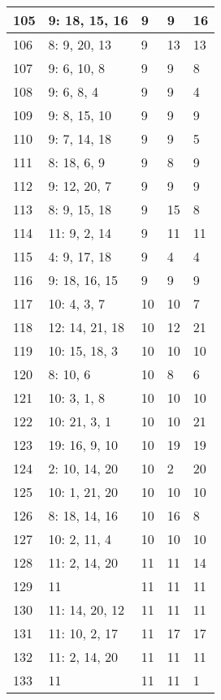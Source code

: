 \documentclass{article} %
\begin{document}
\begin{longtable}{| l | l | l | l | l |}
        105 & 9: 18, 15, 16 & 9 & 9 & 16 \\ \hline
        106 & 8: 9, 20, 13 & 9 & 13 & 13 \\ \hline
        107 & 9: 6, 10, 8 & 9 & 9 & 8 \\ \hline
        108 & 9: 6, 8, 4 & 9 & 9 & 4 \\ \hline
        109 & 9: 8, 15, 10 & 9 & 9 & 9 \\ \hline
        110 & 9: 7, 14, 18 & 9 & 9 & 5 \\ \hline
        111 & 8: 18, 6, 9 & 9 & 8 & 9 \\ \hline
        112 & 9: 12, 20, 7 & 9 & 9 & 9 \\ \hline
        113 & 8: 9, 15, 18 & 9 & 15 & 8 \\ \hline
        114 & 11: 9, 2, 14 & 9 & 11 & 11 \\ \hline
        115 & 4: 9, 17, 18 & 9 & 4 & 4 \\ \hline
        116 & 9: 18, 16, 15 & 9 & 9 & 9 \\ \hline
        117 & 10: 4, 3, 7 & 10 & 10 & 7 \\ \hline
        118 & 12: 14, 21, 18 & 10 & 12 & 21 \\ \hline
        119 & 10: 15, 18, 3 & 10 & 10 & 10 \\ \hline
        120 & 8: 10, 6 & 10 & 8 & 6 \\ \hline
        121 & 10: 3, 1, 8 & 10 & 10 & 10 \\ \hline
        122 & 10: 21, 3, 1 & 10 & 10 & 21 \\ \hline
        123 & 19: 16, 9, 10 & 10 & 19 & 19 \\ \hline
        124 & 2: 10, 14, 20 & 10 & 2 & 20 \\ \hline
        125 & 10: 1, 21, 20 & 10 & 10 & 10 \\ \hline
        126 & 8: 18, 14, 16 & 10 & 16 & 8 \\ \hline
        127 & 10: 2, 11, 4 & 10 & 10 & 10 \\ \hline
        128 & 11: 2, 14, 20 & 11 & 11 & 14 \\ \hline
        129 & 11 & 11 & 11 & 11 \\ \hline
        130 & 11: 14, 20, 12 & 11 & 11 & 11 \\ \hline
        131 & 11: 10, 2, 17 & 11 & 17 & 17 \\ \hline
        132 & 11: 2, 14, 20 & 11 & 11 & 11 \\ \hline
        133 & 11 & 11 & 11 & 1 \\ \hline

\end{longtable}
\end{document}
